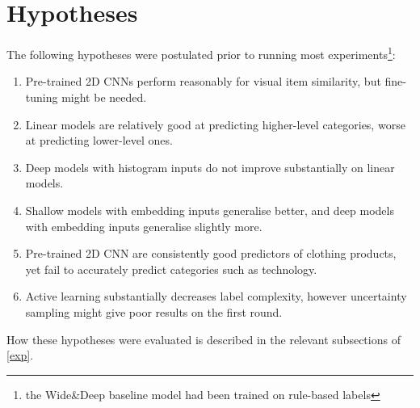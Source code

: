\section{Hypotheses}

The following hypotheses were postulated prior to running most experiments\footnote{the Wide\&Deep baseline model had been trained on rule-based labels}:

\begin{enumerate}
  \item Pre-trained 2D CNNs perform reasonably for visual item similarity, but fine-tuning might be needed.
  \item Linear models are relatively good at predicting higher-level categories, worse at predicting lower-level ones.
  \item Deep models with histogram inputs do not improve substantially on linear models.
  \item Shallow models with embedding inputs generalise better, and deep models with embedding inputs generalise slightly more.
  \item Pre-trained 2D CNN are consistently good predictors  of clothing products, yet fail to accurately predict categories such as technology.

  \item Active learning substantially decreases label complexity, however uncertainty sampling might give poor results on the first round.
\end{enumerate}

\hfill \break
How these hypotheses were evaluated is described in the relevant subsections of \ref{exp}.


